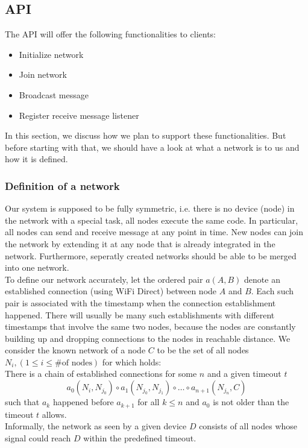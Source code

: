 \subsection{API}
	The API will offer the following functionalities to clients:
	\begin{itemize}
		\item {Initialize network}
		\item {Join network}
		\item {Broadcast message}
		\item {Register receive message listener}
	\end{itemize}
	
	In this section, we discuss how we plan to support these functionalities. But before starting with that, we should have a look at	what a network is to us and how it is defined.\\
	\subsubsection{Definition of a network}
	Our system is supposed to be fully symmetric, i.e. there is no device (node) in the network with a special task, all nodes execute the same code. In particular, all nodes can send and receive message at any point in time. New nodes can join the network by extending it at any node that is already integrated in the network. Furthermore, seperatly created networks should be able to be merged into one network.\\
	To define our network accurately, let the ordered pair $a(A,B)$ denote an established connection (using WiFi Direct) between node $A$ and $B$. Each such pair is associated with the timestamp when the connection establishment happened. There will usually be many such establishments with different timestamps that involve the same two nodes, because the nodes are constantly building up and dropping connections to the nodes in reachable distance. We consider the known network of a node $C$ to be the set of all nodes $N_i, (1 \leq i \leq \text{\# of nodes})$ for which holds:  \\
	There is a chain of established connections for some $n$ and a given timeout $t$
	\begin{displaymath}
		a_0(N_{i},N_{j_0}) \circ a_1(N_{j_0},N_{j_1}) \circ \ldots \circ a_{n+1}(N_{j_n},C)
	\end{displaymath}
	such that $a_k$ happened before $a_{k+1}$ for all $k \leq n$ and $a_0$ is not older than the timeout $t$ allows. \\
	Informally, the network as seen by a given device $D$ consists of all nodes whose signal could reach $D$ within the predefined timeout. \\ 
	
